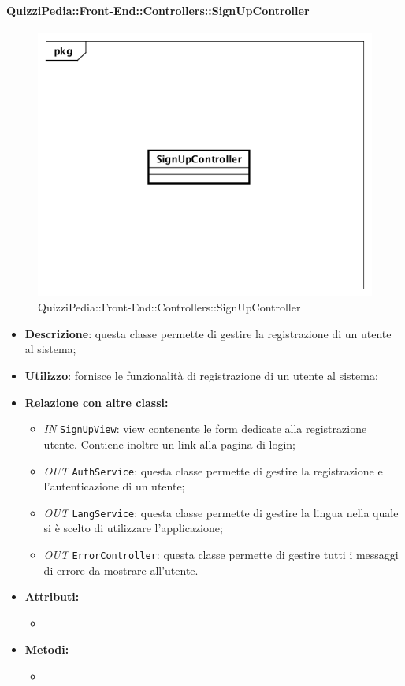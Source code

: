 \paragraph{QuizziPedia::Front-End::Controllers::SignUpController}
\begin{figure}
	\centering
	\includegraphics[scale=0.45]{UML/Classi/Front-End/QuizziPedia_Front-end_Controller_SignUpController.png}
	\caption{QuizziPedia::Front-End::Controllers::SignUpController}
\end{figure}
\begin{itemize}
	\item \textbf{Descrizione}: questa classe permette di gestire la registrazione di un utente al sistema;
	\item \textbf{Utilizzo}: fornisce le funzionalità di registrazione di un utente al sistema;
	\item \textbf{Relazione con altre classi:}
	\begin{itemize}
		\item \textit{IN} \texttt{SignUpView}: view contenente le form dedicate alla registrazione utente. Contiene inoltre un link alla pagina di login;
		\item \textit{OUT} \texttt{AuthService}: questa classe permette di gestire la registrazione e l'autenticazione di un utente;
		\item \textit{OUT} \texttt{LangService}: questa classe permette di gestire la lingua nella quale si è scelto di utilizzare l'applicazione;
		\item \textit{OUT} \texttt{ErrorController}: questa classe permette di gestire tutti i messaggi di errore da mostrare all'utente.
	\end{itemize}
	\item \textbf{Attributi:}
	\begin{itemize}
		\item 
	\end{itemize}
	\item \textbf{Metodi:}
	\begin{itemize}
		\item 
	\end{itemize}
\end{itemize}

